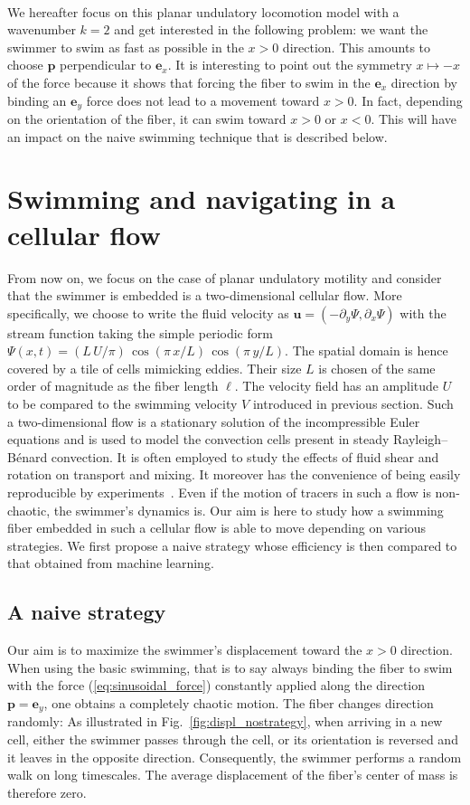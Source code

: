 \documentclass[aps,pre,reprint,superscriptaddress]{revtex4-2}
\begin{document}
\

We hereafter focus on this planar undulatory locomotion model with a wavenumber $k=2$ and get interested in the following problem: we want the swimmer to swim as fast as possible in the $x>0$ direction. This amounts to choose $\bm p$ perpendicular to $\bm e_x$. It is interesting to point out the symmetry  $x\mapsto-x$ of the force because it shows that forcing the fiber to swim in the $\bm e_x$ direction by binding an $\bm e_y$ force does not lead to a movement toward $x>0$. In fact, depending on the orientation of the fiber, it can swim toward $x>0$ or $x<0$. This will have an impact on the naive swimming technique that is described below. 

\section{Swimming and navigating in a cellular flow}
From now on, we focus on the case of planar undulatory motility and consider that the swimmer is embedded is a two-dimensional cellular flow. More specifically, we choose to write the fluid velocity as $\bm u = (-\partial_y\Psi,\partial_x\Psi)$ with the stream function taking the simple periodic form $\Psi(x,t) = (L\,U/\pi)\,\cos(\pi\,x/L)\,\cos(\pi\,y/L)$. The spatial domain is hence covered by a tile of cells mimicking eddies. Their size $L$ is chosen of the same order of magnitude as the fiber length $\ell$. The velocity field has an amplitude $U$ to be compared to the swimming velocity $V$ introduced in previous section. Such a two-dimensional flow is a stationary solution of the incompressible Euler equations and is used to model the convection cells present in steady Rayleigh--B\'enard convection. It is often employed to study the effects of fluid shear and rotation on transport and mixing. It moreover has the convenience of being easily reproducible by experiments~\cite{rothstein1999persistent}. Even if the motion of tracers in such a flow is non-chaotic, the swimmer's dynamics is. Our aim is here to study how a swimming fiber embedded in such a cellular flow is able to move depending on various strategies. We first propose a naive strategy whose efficiency is then compared to that obtained from machine learning.

\subsection{A naive strategy}

Our aim is to maximize the swimmer's displacement toward the $x>0$ direction. When using the basic swimming, that is to say always binding the fiber to swim with the force (\ref{eq:sinusoidal_force}) constantly applied along the direction $\bm p = \bm e_y$, one obtains a completely chaotic motion. The fiber changes direction randomly: As illustrated in Fig.~\ref{fig:displ_nostrategy}, when arriving in a new cell, either the swimmer passes through the cell, or its orientation is reversed and it leaves in the opposite direction. Consequently, the swimmer performs a random walk on long timescales. The average displacement of the fiber's center of mass is therefore zero.
\end{document}
